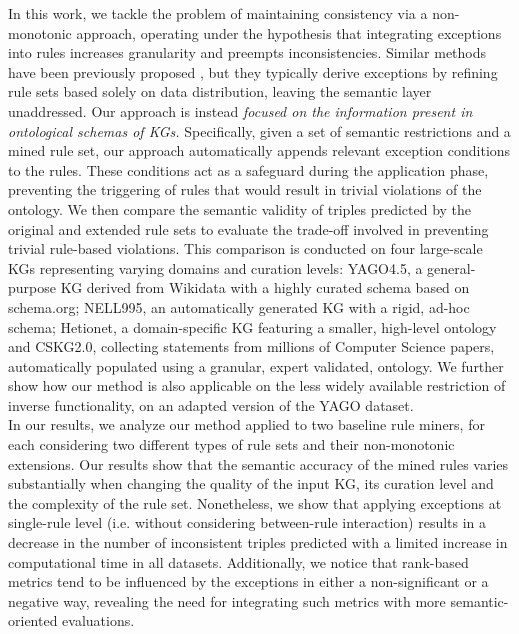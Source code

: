 \documentclass[a4paper,UKenglish,cleveref, autoref, thm-restate]{tgdk-v2021}
\begin{document}
\indent In this work, we tackle the problem of maintaining consistency via a non-monotonic approach, operating under the hypothesis that integrating exceptions into rules increases granularity and preempts inconsistencies. Similar methods have been previously proposed \cite{gad-elrab_exception-enriched_2016,lisi_combining_2017,tran_towards_2017}, but they typically derive exceptions by refining rule sets based solely on data distribution, leaving the semantic layer unaddressed. Our approach is instead \textit{focused on the information present in ontological schemas of KGs.} Specifically, given a set of semantic restrictions and a mined rule set, our approach automatically appends relevant exception conditions to the rules. These conditions act as a safeguard during the application phase, preventing the triggering of rules that would result in trivial violations of the ontology. We then compare the semantic validity of triples predicted by the original and extended rule sets to evaluate the trade-off involved in preventing trivial rule-based violations. This comparison is conducted on four large-scale KGs representing varying domains and curation levels: YAGO4.5, a general-purpose KG derived from Wikidata with a highly curated schema based on schema.org; NELL995, an automatically generated KG with a rigid, ad-hoc schema; Hetionet, a domain-specific KG featuring a smaller, high-level ontology and CSKG2.0, collecting statements from millions of Computer Science papers, automatically populated using a granular, expert validated, ontology. We further show how our method is also applicable on the less widely available restriction of inverse functionality, on an adapted version of the YAGO dataset.\\
\indent In our results, we analyze our method applied to two baseline rule miners, for each considering two different types of rule sets and their non-monotonic extensions. Our results show that the semantic accuracy of the mined rules varies substantially when changing the quality of the input KG, its curation level and the complexity of the rule set. Nonetheless, we show that applying exceptions at single-rule level (i.e. without considering between-rule interaction) results in a decrease in the number of inconsistent triples predicted with a limited increase in computational time in all datasets.
Additionally, we notice that rank-based metrics tend to be influenced by the exceptions in either a non-significant or a negative way, revealing the need for integrating such metrics with more semantic-oriented evaluations.
\end{document}
